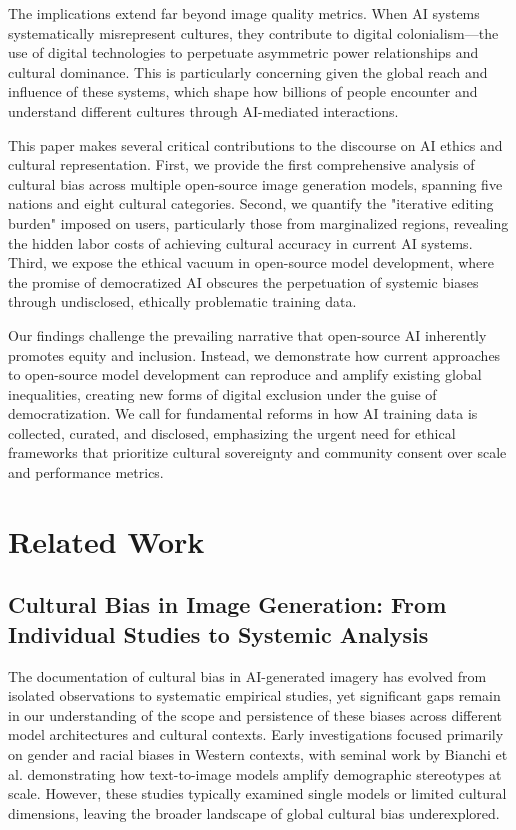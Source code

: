 \documentclass{article}
\begin{document}
The implications extend far beyond image quality metrics. When AI systems systematically misrepresent cultures, they contribute to digital colonialism—the use of digital technologies to perpetuate asymmetric power relationships and cultural dominance. This is particularly concerning given the global reach and influence of these systems, which shape how billions of people encounter and understand different cultures through AI-mediated interactions.

This paper makes several critical contributions to the discourse on AI ethics and cultural representation. First, we provide the first comprehensive analysis of cultural bias across multiple open-source image generation models, spanning five nations and eight cultural categories. Second, we quantify the "iterative editing burden" imposed on users, particularly those from marginalized regions, revealing the hidden labor costs of achieving cultural accuracy in current AI systems. Third, we expose the ethical vacuum in open-source model development, where the promise of democratized AI obscures the perpetuation of systemic biases through undisclosed, ethically problematic training data.

Our findings challenge the prevailing narrative that open-source AI inherently promotes equity and inclusion. Instead, we demonstrate how current approaches to open-source model development can reproduce and amplify existing global inequalities, creating new forms of digital exclusion under the guise of democratization. We call for fundamental reforms in how AI training data is collected, curated, and disclosed, emphasizing the urgent need for ethical frameworks that prioritize cultural sovereignty and community consent over scale and performance metrics.

\section{Related Work}

\subsection{Cultural Bias in Image Generation: From Individual Studies to Systemic Analysis}

The documentation of cultural bias in AI-generated imagery has evolved from isolated observations to systematic empirical studies, yet significant gaps remain in our understanding of the scope and persistence of these biases across different model architectures and cultural contexts. Early investigations focused primarily on gender and racial biases in Western contexts, with seminal work by Bianchi et al. demonstrating how text-to-image models amplify demographic stereotypes at scale. However, these studies typically examined single models or limited cultural dimensions, leaving the broader landscape of global cultural bias underexplored.
\end{document}

